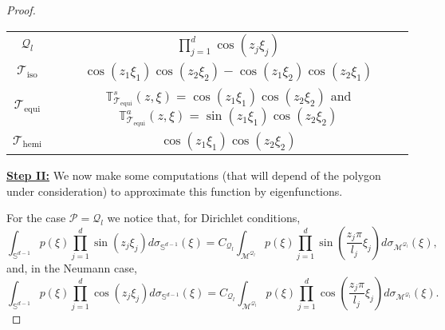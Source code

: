 \documentclass{amsart}
\theoremstyle{definition}
\theoremstyle{remark}
\numberwithin{equation}{section}
\theoremstyle{definition}
\theoremstyle{remark}
\begin{document}
\begin{proof}
\begin{center}
\begin{tabular}{cc}
			\hline
		\rule{0pt}{3ex}$\mathcal{Q}_l$ & $\prod_{j=1}^d\cos\left(z_j\xi_j\right)$ \\
			\rule{0pt}{3ex} $\mathcal{T}_\mathrm{iso}$ & $\cos\left(z_1\xi_1\right)\cos\left(z_2\xi_2\right)-\cos\left(z_1\xi_2\right)\cos\left(z_2\xi_1\right)$  \\
			 \rule{0pt}{3ex}$	\mathcal{T}_\mathrm{equi}$ & $\mathbb{T}_{	\mathcal{T}_\mathrm{equi}}^s(z,\xi)= \cos\left(z_1\xi_1\right)\cos\left(z_2\xi_2\right)$ and $\mathbb{T}_{	\mathcal{T}_\mathrm{equi}}^a(z,\xi)= \sin\left(z_1\xi_1\right)\cos\left(z_2\xi_2\right)$ \\
			\rule{0pt}{3ex} $\mathcal{T}_\mathrm{hemi}$ & $\cos\left(z_1\xi_1\right)\cos\left(z_2\xi_2\right)$ \\
			\hline
		\end{tabular} 
	\end{center}
\textbf{	\underline{Step II:}} We now make some computations (that will depend of the polygon under consideration) to approximate this function by eigenfunctions.
	
	For the case $\mathcal{P}=\mathcal{Q}_l$ we notice that, for Dirichlet conditions,
	\begin{equation}
		\int_{\mathbb{S}^{d-1}} p(\xi) \prod_{j=1}^d\sin\left(z_j\xi_j\right) d\sigma_{\mathbb{S}^{d-1}}(\xi)=C_{\mathcal{Q}_l}\int_{\mathcal{M}^{\mathcal{Q}_l}}p(\xi) \prod_{j=1}^d\sin\left(\frac{z_j\pi}{l_j}\xi_j\right)d\sigma_{\mathcal{M}^{\mathcal{Q}_l}}(\xi),
	\end{equation}and, in the Neumann case, 
	\begin{equation}
		\int_{\mathbb{S}^{d-1}} p(\xi) \prod_{j=1}^d\cos\left(z_j\xi_j\right) d\sigma_{\mathbb{S}^{d-1}}(\xi)=C_{\mathcal{Q}_l}\int_{\mathcal{M}^{\mathcal{Q}_l}}p(\xi) \prod_{j=1}^d\cos\left(\frac{z_j\pi}{l_j}\xi_j\right)d\sigma_{\mathcal{M}^{\mathcal{Q}_l}}(\xi).
	\end{equation}
	

\end{proof}
\end{document}
